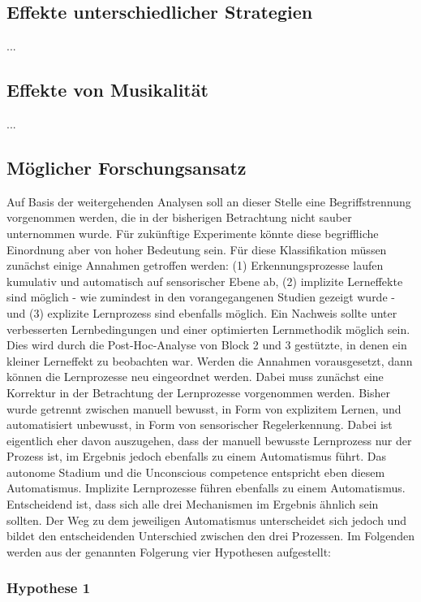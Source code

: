 \documentclass[doc,a4paper,12pt]{apa6}
\begin{document}
\subsection{Effekte unterschiedlicher Strategien}

...

\subsection{Effekte von Musikalität}

...

\subsection{Möglicher Forschungsansatz}

Auf Basis der weitergehenden Analysen soll an dieser Stelle eine Begriffstrennung vorgenommen werden, die in der bisherigen Betrachtung nicht sauber unternommen wurde. Für zukünftige Experimente könnte diese begriffliche Einordnung aber von hoher Bedeutung sein. Für diese Klassifikation müssen zunächst einige Annahmen getroffen werden: (1) Erkennungsprozesse laufen kumulativ und automatisch auf sensorischer Ebene ab, (2) implizite Lerneffekte sind möglich - wie zumindest in den vorangegangenen Studien gezeigt wurde - und (3) explizite Lernprozess sind ebenfalls möglich. Ein Nachweis sollte  unter verbesserten Lernbedingungen und einer optimierten Lernmethodik möglich sein. Dies wird durch die Post-Hoc-Analyse von Block 2 und 3 gestützte, in denen ein kleiner Lerneffekt zu beobachten war. Werden die Annahmen vorausgesetzt, dann können die Lernprozesse neu eingeordnet werden. Dabei muss zunächst eine Korrektur in der Betrachtung der Lernprozesse vorgenommen werden. Bisher wurde getrennt zwischen manuell bewusst, in Form von explizitem Lernen, und automatisiert unbewusst, in Form von sensorischer Regelerkennung. Dabei ist eigentlich eher davon auszugehen, dass der manuell bewusste Lernprozess nur der Prozess ist, im Ergebnis jedoch ebenfalls zu einem Automatismus führt. Das autonome Stadium und die Unconscious competence entspricht eben diesem Automatismus. Implizite Lernprozesse führen ebenfalls zu einem Automatismus. Entscheidend ist, dass sich alle drei Mechanismen im Ergebnis ähnlich sein sollten. Der Weg zu dem jeweiligen Automatismus unterscheidet sich jedoch und bildet den entscheidenden Unterschied zwischen den drei Prozessen. Im Folgenden werden aus der genannten Folgerung vier Hypothesen aufgestellt:

\subsubsection{Hypothese 1}
\end{document}
